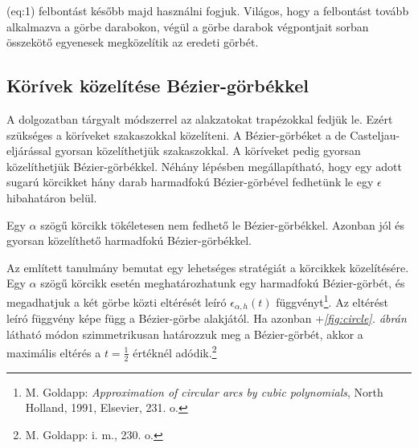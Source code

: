 \documentclass[12pt]{report}
\theoremstyle{definition}
\begin{document}
\Aref({eq:1}) felbontást később majd használni fogjuk. Világos, hogy a felbontást
tovább alkalmazva a görbe darabokon, végül a görbe darabok végpontjait sorban
összekötő egyenesek megközelítik az eredeti görbét.

    \subsection*{Körívek közelítése Bézier-görbékkel}
    \label{sec:arctobezier}

A dolgozatban tárgyalt módszerrel az alakzatokat trapézokkal fedjük le. Ezért
szükséges a köríveket szakaszokkal közelíteni. A Bézier-görbéket a de
Casteljau-eljárással gyorsan közelíthetjük szakaszokkal. A köríveket pedig
gyorsan közelíthetjük Bézier-görbékkel. Néhány lépésben megállapítható, hogy
egy adott sugarú körcikket hány darab harmadfokú Bézier-görbével fedhetünk le
egy $\epsilon$ hibahatáron belül.

Egy $\alpha$ szögű körcikk tökéletesen nem fedhető le
Bézier-görbékkel\cite[Goldapp]{Goldapp:1991:approximation}. Azonban jól és
gyorsan közelíthető harmadfokú Bézier-görbékkel.

Az említett \cite[Goldapp]{Goldapp:1991:approximation} tanulmány bemutat egy
lehetséges stratégiát a körcikkek közelítésére. Egy $\alpha$ szögű körcikk
esetén meghatározhatunk egy harmadfokú Bézier-görbét, és megadhatjuk a két
görbe közti eltérését leíró $\epsilon_{\alpha,h}(t)$ függvényt\footnote{M.
Goldapp: \emph{Approximation of circular arcs by cubic polynomials}, North
Holland, 1991, Elsevier, 231. o.}. Az eltérést leíró függvény képe függ a
Bézier-görbe alakjától. Ha azonban \az+\emph{\ref{fig:circle}. ábrán} látható
módon szimmetrikusan határozzuk meg a Bézier-görbét, akkor a maximális eltérés
a $t=\frac{1}{2}$ értéknél adódik.\footnote{M. Goldapp: i. m., 230. o.}
\end{document}
